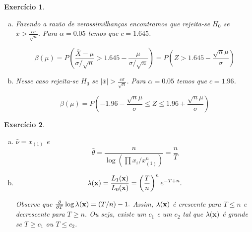 \documentclass[letter,11pt]{article}
\newtheorem{exer}{Exercício}
\begin{document}
\begin{exer} \rm  %
\begin{enumerate}[a)]
\item %


Fazendo a razão de verossimilhanças encontramos que rejeita-se $H_0$ se $\overline{x}>\frac{c\sigma}{\sqrt{n}}$. Para $\alpha=0.05$ temos que $c=1.645$.

\[\beta(\mu)=P\left(\frac{\overline{X}-\mu}{\sigma/\sqrt{n}}>1.645-\frac{\mu}{\sigma/\sqrt{n}}\right)=P\left(Z>1.645-\frac{\sqrt{n}\mu}{\sigma}\right)\]

\item %
Nesse caso rejeita-se $H_0$ se $|\overline{x}|>\frac{c\sigma}{\sqrt{n}}$. Para $\alpha=0.05$ temos que $c=1.96$.

\[\beta(\mu)=P\left(-1.96-\frac{\sqrt{n}\mu}{\sigma}\leq Z\leq 1.96+\frac{\sqrt{n}\mu}{\sigma}\right)\]

\end{enumerate}
\end{exer}


\begin{exer} \rm  %
% 

\begin{enumerate}[a)]
\item %
$\hat{\nu}=x_{(1)}$ e \[\hat{\theta}=\frac{n}{\log\left(\prod x_i/x_{(1)}^n\right)}=\frac{n}{T}\]
\item %
\[\lambda({\bf x})=\frac{L_1({\bf x})}{L_0({\bf x})}=\left(\frac{T}{n}\right)^n e^{-T+n}.\]

Observe que $\frac{\partial}{\partial T}\log \lambda({\bf x})=(T/n) -1. $ Assim,  $\lambda({\bf x})$ é crescente para $T\leq n$ e decrescente para $T\geq n$. Ou seja, existe um $c_1$ e um $c_2$ tal que  $\lambda({\bf x})$ é grande se $T\geq c_1$ ou $T\leq c_2$.
\end{enumerate}
\end{exer}
\end{document}
